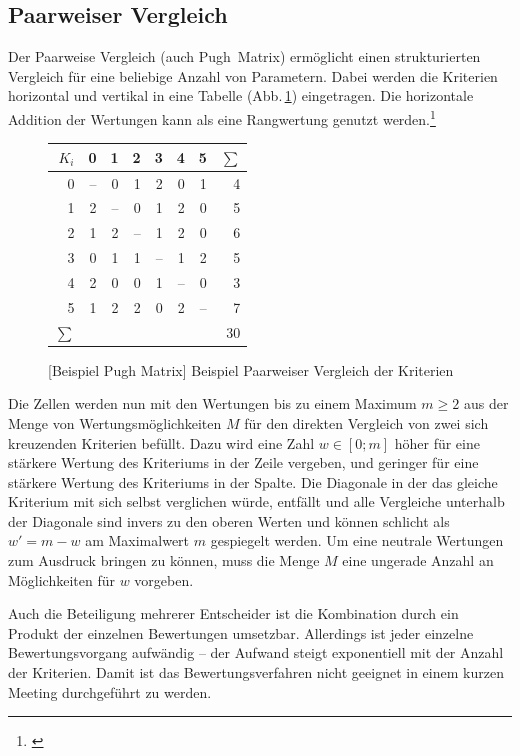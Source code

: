 \subsection{Paarweiser Vergleich}

Der Paarweise Vergleich (auch Pugh~Matrix) ermöglicht einen strukturierten Vergleich für eine beliebige Anzahl von Parametern.
Dabei werden die Kriterien horizontal und vertikal in eine Tabelle (Abb.\,\ref{abb:pugh-matrix}) eingetragen.
Die horizontale Addition der Wertungen kann als eine Rangwertung genutzt werden.\footnote{\cite{TN_libero_mab21000123709}}

\begin{figure}[!htp]
\centering
\begin{tabular}{|r||r|r|r|r|r|r||r|}
\hline
\(K_i\)	& 0 	& 1 	& 2 	& 3 	& 4 	& 5	& \(\sum{}\)\\
\hline \hline
0		& --	& 0		& 1		& 2		& 0		& 1	& 4			\\
\hline
1		& 2		& --	& 0		& 1		& 2		& 0	& 5			\\
\hline
2		& 1		& 2		& --	& 1		& 2		& 0	& 6			\\
\hline
3		& 0		& 1		& 1		& --	& 1		& 2	& 5			\\
\hline
4		& 2		& 0		& 0		& 1		& --	& 0	& 3			\\
\hline
5		& 1		& 2		& 2		& 0		& 2		& --& 7			\\
\hline \hline
\(\sum{}\) & \multicolumn{6}{r||}{} & {30} \\
\hline
\end{tabular}
[Beispiel Pugh Matrix]{\label{abb:pugh-matrix} Beispiel Paarweiser Vergleich der Kriterien}
\end{figure}

Die Zellen werden nun mit den Wertungen bis zu einem Maximum \(m \ge 2\) aus der Menge von Wertungsmöglichkeiten \(M\) für den direkten Vergleich von zwei sich kreuzenden Kriterien befüllt.
Dazu wird eine Zahl \(w \in [0;m] \)  höher für eine stärkere Wertung des Kriteriums in der Zeile vergeben, und geringer für eine stärkere Wertung des Kriteriums in der Spalte.
Die Diagonale in der das gleiche Kriterium mit sich selbst verglichen würde, entfällt und alle Vergleiche unterhalb der Diagonale sind invers zu den oberen Werten und können schlicht als \(w' = m - w\) am Maximalwert \(m\) gespiegelt werden.
Um eine neutrale Wertungen zum Ausdruck bringen zu können, muss die Menge \(M\) eine ungerade Anzahl an Möglichkeiten für \(w\) vorgeben.

Auch die Beteiligung mehrerer Entscheider ist die Kombination durch ein Produkt der einzelnen Bewertungen umsetzbar.
Allerdings ist jeder einzelne Bewertungsvorgang aufwändig -- der Aufwand steigt exponentiell mit der Anzahl der Kriterien.
Damit ist das Bewertungsverfahren nicht geeignet in einem kurzen Meeting durchgeführt zu werden.

